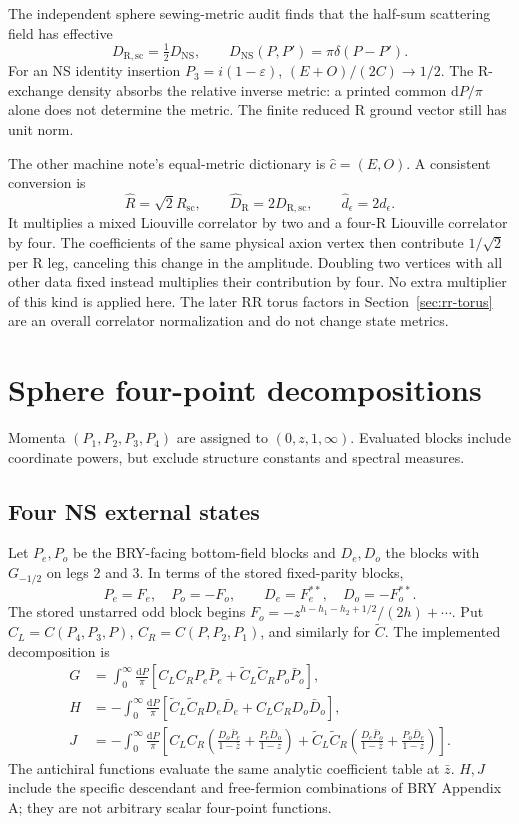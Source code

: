 \documentclass[11pt]{article}
\newcommand{\NS}{\mathrm{NS}}
\newcommand{\R}{\mathrm{R}}
\newcommand{\Ct}{\widetilde C}
\newcommand{\dd}{\mathrm d}
\begin{document}
The independent sphere sewing-metric audit finds that the half-sum
scattering field has effective
\begin{equation}
 D_{\R,\mathrm{sc}}=\tfrac12D_\NS,\qquad
 D_\NS(P,P')=\pi\delta(P-P').
 \label{eq:metric}
\end{equation}
For an NS identity insertion \(P_3=i(1-\varepsilon)\),
\((E+O)/(2C)\to1/2\). The R-exchange density absorbs the relative
inverse metric: a printed common \(\dd P/\pi\) alone does not determine
the metric. The finite reduced R ground vector still has unit norm.

The other machine note's equal-metric dictionary is
\(\widehat c=(E,O)\). A consistent conversion is
\begin{equation}
 \widehat R=\sqrt2R_{\mathrm{sc}},\qquad
 \widehat D_\R=2D_{\R,\mathrm{sc}},\qquad
 \widehat d_\epsilon=2d_\epsilon.
\end{equation}
It multiplies a mixed Liouville correlator by two and a four-R
Liouville correlator by four. The coefficients of the same physical
axion vertex then contribute \(1/\sqrt2\) per R leg, canceling this
change in the amplitude. Doubling two vertices with all other data
fixed instead multiplies their contribution by four.
No extra multiplier of this kind is applied here.
The later RR torus factors in Section~\ref{sec:rr-torus} are an
overall correlator normalization and do not change state metrics.

\section{Sphere four-point decompositions}
Momenta \((P_1,P_2,P_3,P_4)\) are assigned to \((0,z,1,\infty)\).
Evaluated blocks include coordinate powers, but exclude structure
constants and spectral measures.

\subsection{Four NS external states}
Let \(P_e,P_o\) be the BRY-facing bottom-field blocks and
\(D_e,D_o\) the blocks with \(G_{-1/2}\) on legs 2 and 3.
In terms of the stored fixed-parity blocks,
\[
 P_e=F_e,\quad P_o=-F_o,\qquad
 D_e=F_e^{**},\quad D_o=-F_o^{**}.
\]
The stored unstarred odd block begins
\(F_o=-z^{h-h_1-h_2+1/2}/(2h)+\cdots\).
Put \(C_L=C(P_4,P_3,P)\), \(C_R=C(P,P_2,P_1)\), and similarly
for \(\Ct\). The implemented decomposition is
\begin{align}
 G&=\int_0^\infty\frac{\dd P}{\pi}
 [C_LC_RP_e\bar P_e+\Ct_L\Ct_RP_o\bar P_o],\label{eq:G}\\
 H&=-\int_0^\infty\frac{\dd P}{\pi}
 [\Ct_L\Ct_RD_e\bar D_e+C_LC_RD_o\bar D_o],\\
 J&=-\int_0^\infty\frac{\dd P}{\pi}
 \left[C_LC_R\left(\frac{D_o\bar P_e}{1-\bar z}
                         +\frac{P_e\bar D_o}{1-z}\right)
 +\Ct_L\Ct_R\left(\frac{D_e\bar P_o}{1-\bar z}
                         +\frac{P_o\bar D_e}{1-z}\right)\right].
\end{align}
The antichiral functions evaluate the same analytic coefficient table
at \(\bar z\). \(H,J\) include the specific descendant and free-fermion
combinations of BRY Appendix A; they are not arbitrary scalar
four-point functions.
\end{document}
